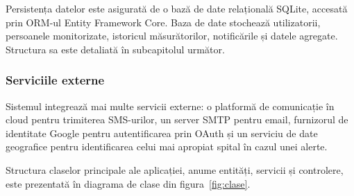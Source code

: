 \documentclass[12pt,a4paper]{article}
\begin{document}
Persistența datelor este asigurată de o bază de date relațională SQLite, accesată prin ORM-ul Entity Framework Core. Baza de date stochează utilizatorii, persoanele monitorizate, istoricul măsurătorilor, notificările și datele agregate. Structura sa este detaliată în subcapitolul următor.

\subsubsection{Serviciile externe}

Sistemul integrează mai multe servicii externe: o platformă de comunicație în cloud pentru trimiterea SMS-urilor, un server SMTP pentru email, furnizorul de identitate Google pentru autentificarea prin OAuth și un serviciu de date geografice pentru identificarea celui mai apropiat spital în cazul unei alerte.

Structura claselor principale ale aplicației, anume entități, servicii și controlere, este prezentată în diagrama de clase din figura~\ref{fig:clase}.
\end{document}
